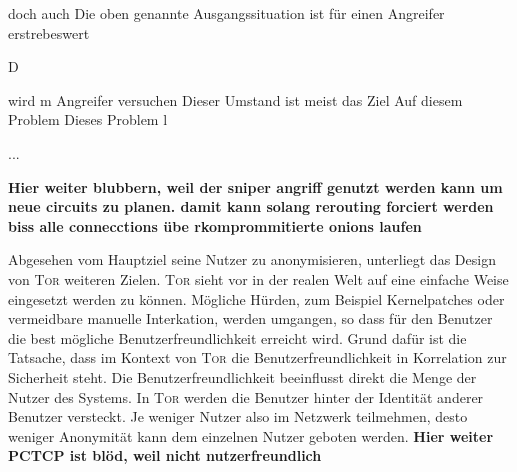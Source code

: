 \documentclass[fleqn,envcountsame,runningheads,10pt,a4paper]{llncs}
\begin{document}
doch auch Die oben genannte Ausgangssituation ist für einen Angreifer erstrebeswert


D

wird m Angreifer versuchen Dieser Umstand ist meist das Ziel Auf diesem Problem Dieses Problem l



...


\textbf{Hier weiter blubbern, weil der sniper angriff genutzt werden kann um neue circuits zu planen. damit kann solang rerouting forciert werden biss alle connecctions übe rkomprommitierte onions laufen}


Abgesehen vom Hauptziel seine Nutzer zu anonymisieren, unterliegt das Design von \textsc{Tor} weiteren Zielen. \textsc{Tor} sieht vor in der realen Welt auf eine einfache Weise eingesetzt werden zu können. Mögliche Hürden, zum Beispiel Kernelpatches oder vermeidbare manuelle Interkation, werden umgangen, so dass für den Benutzer die best mögliche Benutzerfreundlichkeit erreicht wird. Grund dafür ist die Tatsache, dass im Kontext von \textsc{Tor} die Benutzerfreundlichkeit in Korrelation zur Sicherheit steht. Die Benutzerfreundlichkeit beeinflusst direkt die Menge der Nutzer des Systems. In \textsc{Tor} werden die Benutzer hinter der Identität anderer Benutzer versteckt. Je weniger Nutzer also im Netzwerk teilmehmen, desto weniger Anonymität kann dem einzelnen Nutzer geboten werden. \textbf{Hier weiter PCTCP ist blöd, weil nicht nutzerfreundlich}







\nocite{imux}





\end{document}
